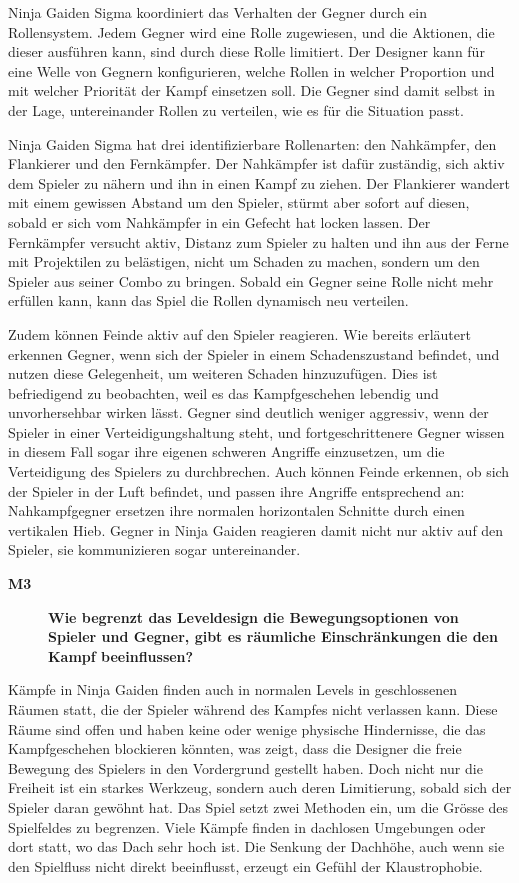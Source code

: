 \documentclass[../Main.tex]{subfiles}
\begin{document}
Ninja Gaiden Sigma koordiniert das Verhalten der Gegner durch ein Rollensystem. Jedem Gegner wird eine Rolle zugewiesen, und die Aktionen, die dieser ausführen kann, sind durch diese Rolle limitiert. Der Designer kann für eine Welle von Gegnern konfigurieren, welche Rollen in welcher Proportion und mit welcher Priorität der Kampf einsetzen soll. Die Gegner sind damit selbst in der Lage, untereinander Rollen zu verteilen, wie es für die Situation passt.

Ninja Gaiden Sigma hat drei identifizierbare Rollenarten: den Nahkämpfer, den Flankierer und den Fernkämpfer. Der Nahkämpfer ist dafür zuständig, sich aktiv dem Spieler zu nähern und ihn in einen Kampf zu ziehen. Der Flankierer wandert mit einem gewissen Abstand um den Spieler, stürmt aber sofort auf diesen, sobald er sich vom Nahkämpfer in ein Gefecht hat locken lassen. Der Fernkämpfer versucht aktiv, Distanz zum Spieler zu halten und ihn aus der Ferne mit Projektilen zu belästigen, nicht um Schaden zu machen, sondern um den Spieler aus seiner Combo zu bringen. Sobald ein Gegner seine Rolle nicht mehr erfüllen kann, kann das Spiel die Rollen dynamisch neu verteilen.

Zudem können Feinde aktiv auf den Spieler reagieren. Wie bereits erläutert erkennen Gegner, wenn sich der Spieler in einem Schadenszustand befindet, und nutzen diese Gelegenheit, um weiteren Schaden hinzuzufügen. Dies ist befriedigend zu beobachten, weil es das Kampfgeschehen lebendig und unvorhersehbar wirken lässt. Gegner sind deutlich weniger aggressiv, wenn der Spieler in einer Verteidigungshaltung steht, und fortgeschrittenere Gegner wissen in diesem Fall sogar ihre eigenen schweren Angriffe einzusetzen, um die Verteidigung des Spielers zu durchbrechen. Auch können Feinde erkennen, ob sich der Spieler in der Luft befindet, und passen ihre Angriffe entsprechend an: Nahkampfgegner ersetzen ihre normalen horizontalen Schnitte durch einen vertikalen Hieb. Gegner in Ninja Gaiden reagieren damit nicht nur aktiv auf den Spieler, sie kommunizieren sogar untereinander.

\begin{description}
  \item[\textbf{M3}] \textbf{Wie begrenzt das Leveldesign die Bewegungsoptionen von Spieler und Gegner, gibt es räumliche Einschränkungen die den Kampf beeinflussen?}
\end{description}

Kämpfe in Ninja Gaiden finden auch in normalen Levels in geschlossenen Räumen statt, die der Spieler während des Kampfes nicht verlassen kann. Diese Räume sind offen und haben keine oder wenige physische Hindernisse, die das Kampfgeschehen blockieren könnten, was zeigt, dass die Designer die freie Bewegung des Spielers in den Vordergrund gestellt haben. Doch nicht nur die Freiheit ist ein starkes Werkzeug, sondern auch deren Limitierung, sobald sich der Spieler daran gewöhnt hat. Das Spiel setzt zwei Methoden ein, um die Grösse des Spielfeldes zu begrenzen. Viele Kämpfe finden in dachlosen Umgebungen oder dort statt, wo das Dach sehr hoch ist. Die Senkung der Dachhöhe, auch wenn sie den Spielfluss nicht direkt beeinflusst, erzeugt ein Gefühl der Klaustrophobie.
\end{document}
